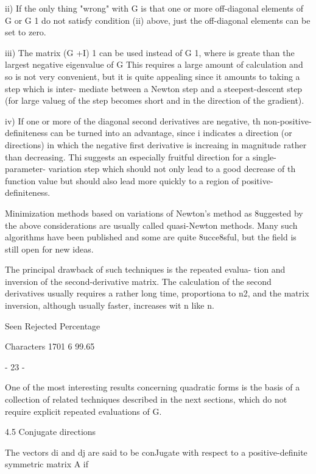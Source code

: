  ii) If the only thing "wrong" with G is that one or more off-diagonal
     elements of G or G 1 do not satisfy condition (ii) above, just the
     off-diagonal elements can be set to zero.
 
iii) The matrix (G +I) 1 can be used instead of G 1, where  is greate
     than the largest negative eigenvalue of G   This requires a large
     amount of calculation and so is not very convenient, but it is
     quite appealing since it amounts to taking a step which is inter-
     mediate between a Newton step and a steepest-descent step (for
     large valueg of  the step becomes short and in the direction of
     the gradient).
 
 iv) If one or more of the diagonal second derivatives are negative, th
     non-positive-definiteness can be turned into an advantage, since i
     indicates a direction (or directions) in which the negative first
     derivative is increaing in magnitude rather than decreasing.  Thi
     suggests an especially fruitful direction for a single-parameter-
     variation step which should not only lead to a good decrease of th
     function value but should also lead more quickly to a region of
     positive-definiteness.
 
     Minimization methods based on variations of Newton's method as
8uggested by the above considerations are usually called quasi-Newton
methods.  Many such algorithms have been published and some are quite
8ucce8sful, but the field is still open for new ideas.
 
     The principal drawback of such techniques is the repeated evalua-
tion and inversion of the second-derivative matrix.  The calculation of
the second derivatives usually requires a rather long time, proportiona
to n2, and the matrix inversion, although usually faster, increases wit
n like n.
 
                 Seen Rejected  Percentage
 
Characters       1701        6   99.65
 
                                - 23 -
 
 
     One of the most interesting results concerning quadratic forms is
the basis of a collection of related techniques described in the next
sections, which do not require explicit repeated evaluations of G.
 
 
4.5  Conjugate directions
 
     The vectors di and dj are said to be conJugate with respect to a
positive-definite symmetric matrix A if
 
